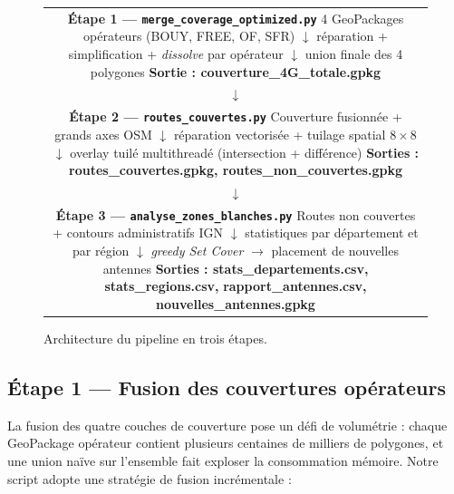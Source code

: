 \documentclass[11pt,a4paper]{article}
\begin{document}
\begin{figure}[H]
  \centering
  \begin{tabular}{c}
    \fbox{\parbox{0.85\linewidth}{
      \textbf{Étape 1 — \texttt{merge\_coverage\_optimized.py}}\\
      4 GeoPackages opérateurs (BOUY, FREE, OF, SFR)\\
      $\downarrow$ réparation + simplification + \emph{dissolve} par opérateur\\
      $\downarrow$ union finale des 4 polygones\\
      \textbf{Sortie : couverture\_4G\_totale.gpkg}
    }}\\[0.5cm]
    $\downarrow$\\[0.3cm]
    \fbox{\parbox{0.85\linewidth}{
      \textbf{Étape 2 — \texttt{routes\_couvertes.py}}\\
      Couverture fusionnée + grands axes OSM\\
      $\downarrow$ réparation vectorisée + tuilage spatial $8\times8$\\
      $\downarrow$ overlay tuilé multithreadé (intersection + différence)\\
      \textbf{Sorties : routes\_couvertes.gpkg, routes\_non\_couvertes.gpkg}
    }}\\[0.5cm]
    $\downarrow$\\[0.3cm]
    \fbox{\parbox{0.85\linewidth}{
      \textbf{Étape 3 — \texttt{analyse\_zones\_blanches.py}}\\
      Routes non couvertes + contours administratifs IGN\\
      $\downarrow$ statistiques par département et par région\\
      $\downarrow$ \emph{greedy Set Cover} $\rightarrow$ placement de nouvelles antennes\\
      \textbf{Sorties : stats\_departements.csv, stats\_regions.csv,}\\
      \textbf{rapport\_antennes.csv, nouvelles\_antennes.gpkg}
    }}
  \end{tabular}
  \caption{Architecture du pipeline en trois étapes.}
  \label{fig:pipeline}
\end{figure}

\subsection{Étape 1 — Fusion des couvertures opérateurs}

La fusion des quatre couches de couverture pose un défi de volumétrie : chaque GeoPackage opérateur contient plusieurs centaines de milliers de polygones, et une union naïve sur l'ensemble fait exploser la consommation mémoire. Notre script adopte une stratégie de fusion incrémentale :
\end{document}
